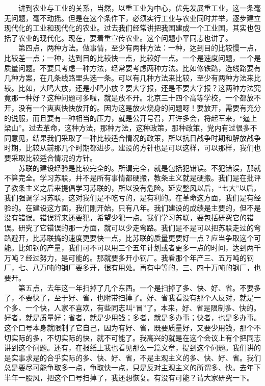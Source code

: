 \documentclass[cn,11pt,chinese]{elegantbook}
\begin{document}
　　讲到农业与工业的关系，当然，以重工业为中心，优先发展重工业，这一条毫无问题，毫不动摇。但是在这个条件下，必须实行工业与农业同时并举，逐步建立现代化的工业和现代化的农业。过去我们经常讲把我国建成一个工业国，其实也包括了农业的现代化。现在，要着重宣传农业。这个问题小平同志也讲了。\\
　　第四点，两种方法。做事情，至少有两种方法：一种，达到目的比较慢一点，比较差一点；一种，达到目的比较快一点，比较好一点。一个是速度问题，一个是质量问题。不要只考虑一种方法，经常要考虑两种方法。比如修铁路，选线路要有几种方案，在几条线路里头选一条。可以有几种方法来比较，至少有两种方法来比较。比如，大鸣大放，还是小鸣小放？要大字报，还是不要大字报？这两种方法究竟那一种好？这种问题可多啦，就是放不开。北京三十四个高等学校，一个都放不开，没有一个爽爽快快放开的。因为这是放火烧身的问题呀！要放开，需要有充分的说服，而且要有一种相当的压力，就是公开号召，开许多会，将起军来，“逼上梁山”。过去革命，这种方法，那种方法，这种政策，那种政策，党内有过很多不同意见，结果我们采取了一种比较适合情况的政策，所以抗日战争时期和解放战争时期，比较从前那几个时期都进步。建设的方针也是可以这样，可以那样，我们也要采取比较适合情况的方针。\\
　　苏联的建设经验是比较完全的。所谓完全，就是包括犯错误。不犯错误，那就不算完全。学习苏联，并不是所有事情都硬搬，教条主义就是硬搬。我们是在批评了教条主义之后来提倡学习苏联的，所以没有危险。延安整风以后，“七大”以后，我们强调学习苏联，这对我们是不吃亏的，是有利的。在革命这方面，我们是有经验的。在建设这方面，我们刚开始，只有八年。我们建设的成绩是主要的，但不是没有错误。错误将来还要犯，希望少犯一点。我们学习苏联，要包括研究它的错误。研究了它错误的那一方面，就可以少走弯路。我们是不是可以把苏联走过的弯路避开，比苏联搞的速度更要快一点，比苏联的质量更要好一点？应当争取这个可能。比如钢的产量，我们可不可以用三个五年计划或者更多一点的时间，达到两千万吨？经过努力，是可能的。那就要多开小钢厂。我看那个年产三、五万吨的钢厂，七、八万吨的钢厂要多开，很有用处。再有中等的，三、四十万吨的钢厂，也要开。\\
　　第五点，去年这一年扫掉了几个东西。一个是扫掉了多、快、好、省。不要多了，不要快了，至于好、省，也附带扫掉了。好、省我看没有那个人反对，就是一个多、一个快，人家不喜欢，有些同志叫“冒”了。本来，好、省是限制多、快的。好者，就是质量好；省者，就是少用钱；多者，就是多办事；快者，也是多办事。这个口号本身就限制了它自己，因为有好、省，既要质量好，又要少用钱，那个不切实际的多，不切实际的快，就不可能了。我高兴的就是在这个会议上有个把同志讲到这个问题。还有，在报纸上我也看见那么一篇文章，提到这个问题。我们讲的是实事求是的合乎实际的多、快、好、省，不是主观主义的多、快、好、省。我们总是要尽可能争取多一点，争取快一点，只是反对主观主义的所谓多、快。去年下半年一股风，把这个口号扫掉了，我还想恢复。有没有可能？请大家研究一下。\\
\end{document}
